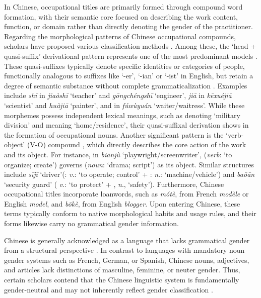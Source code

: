 \documentclass[11pt]{article}
\newcommand{\zh}[1]{\simplifiedchinesefont{#1}\rmfamily}
\begin{document}
In Chinese, occupational titles are primarily formed through compound word formation, with their semantic core focused on describing the work content, function, or domain rather than directly denoting the gender of the practitioner. Regarding the morphological patterns of Chinese occupational compounds, scholars have proposed various classification methods \citep{packard_2000_morphology,fu_2014_chinese}. 
Among these, the `head + quasi-suffix' derivational pattern represents one of the most predominant models \citep{fu_2014_chinese}. These quasi-suffixes typically denote specific identities or categories of people, functionally analogous to suffixes like `-er', `-ian' or `-ist' in English, but retain a degree of semantic substance without complete grammaticalization \citep{fu_2014_chinese}. 
Examples include \zh{师} \textit{shī} in \zh{教师} \textit{jiaòshī} `teacher' and \zh{工程师} \textit{gōngchéngshī} `engineer', \zh{家} \textit{jiā} in \zh{科学家} \textit{kēxuéjiā} `scientist' and \zh{画家} \textit{huàjiā} `painter', and \zh{员} in \zh{服务员} \textit{fúwùyuán} `waiter/waitress'. While these morphemes possess independent lexical meanings, such as \zh{师} denoting `military division' and \zh{家} meaning `home/residence', their quasi-suffixal derivation shows in the formation of occupational nouns. Another significant pattern is the `verb-object' (V-O) compound \citep{packard_2000_morphology}, which directly describes the core action of the work and its object. 
For instance, in \zh{编剧} \textit{biānjù} `playwright/screenwriter', \zh{编} (\textit{verb}: `to organize; create') governs \zh{剧} (\textit{noun}: `drama; script') as its object. Similar structures include \zh{司机} \textit{sījī} `driver'(\zh{司}: \textit{v}.: `to operate; control' + \zh{机}: \textit{n}.: `machine/vehicle') and \zh{保安} \textit{baǒān} `security guard' (\zh{保} \textit{v}.: `to protect' + \zh{安}, \textit{n}., `safety'). Furthermore, Chinese occupational titles incorporate loanwords, such as \zh{模特} \textit{mótè}, from French \textit{modèle} or English \textit{model}, and \zh{博客} \textit{bōkè}, from English \textit{blogger}. Upon entering Chinese, these terms typically conform to native morphological habits and usage rules, and their forms likewise carry no grammatical gender information.


Chinese is generally acknowledged as a language that lacks grammatical gender from a structural perspective \citep{li_1989_mandarin}. In contrast to languages with mandatory noun gender systems such as French, German, or Spanish, Chinese nouns, adjectives, and articles lack distinctions of masculine, feminine, or neuter gender. Thus, certain scholars contend that the Chinese linguistic system is fundamentally gender-neutral and may not inherently reflect gender classification \citep{li_1989_mandarin,packard_2000_morphology}.
\end{document}
